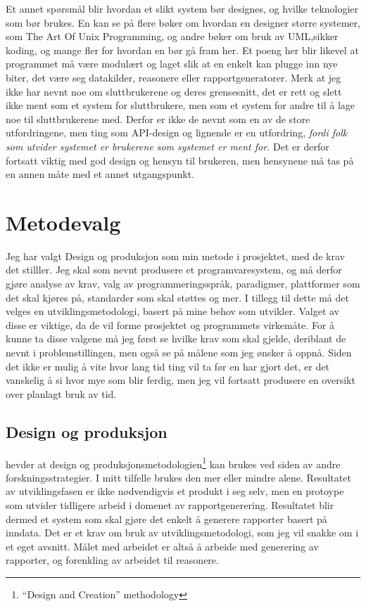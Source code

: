 \documentclass[11pt]{article}
\begin{document}
Et annet spørsmål blir hvordan et slikt system bør designes, og hvilke teknologier som bør brukes. En kan se på flere bøker om hvordan en designer større systemer, som The Art Of Unix Programming\cite{taoup}, og andre bøker om bruk av UML\cite{umlpatterns},sikker koding\cite{certguide}, og mange fler for hvordan en bør gå fram her. Et poeng her blir likevel at programmet må være modulært og laget slik at en enkelt kan plugge inn nye biter, det være seg datakilder, reasonere eller rapportgeneratorer. Merk at jeg ikke har nevnt noe om sluttbrukerene og deres grensesnitt, det er rett og slett ikke ment som et system for sluttbrukere, men som et system for andre til å lage noe til sluttbrukerene med. Derfor er ikke de nevnt som en av de store utfordringene, men ting som API-design og lignende er en utfordring, \emph{fordi folk som utvider systemet er brukerene som systemet er ment for.} Det er derfor fortsatt viktig med god design og hensyn til brukeren, men hensynene må tas på en annen måte med et annet utgangspunkt.

\section{Metodevalg}
Jeg har valgt Design og produksjon som min metode i prosjektet, med de krav det stilller.
Jeg skal som nevnt produsere et programvaresystem, og må derfor gjøre analyse av krav, valg av programmeringsspråk, paradigmer, plattformer som det skal kjøres på, standarder som skal støttes og mer.
I tillegg til dette må det velges en utviklingsmetodologi, basert på mine behov som utvikler. Valget av disse er viktige, da de vil forme prosjektet og programmets virkemåte. For å kunne ta disse valgene må jeg først se hvilke krav som skal gjelde, deriblant de nevnt i problemstillingen, men også se på målene som jeg ønsker å oppnå.
Siden det ikke er mulig å vite hvor lang tid ting vil ta før en har gjort det, er det vanskelig å si hvor mye som blir ferdig, men jeg vil fortsatt produsere en oversikt over planlagt bruk av tid.


\subsection{Design og produksjon}
\cite[p.111]{Oates2006} hevder at design og produksjonsmetodologien\footnote{``Design and Creation'' methodology} kan brukes ved siden av andre forskningsstrategier. I mitt tilfelle brukes den mer eller mindre alene.
Resultatet av utviklingsfasen er ikke nødvendigvis et produkt i seg selv, men en protoype som utvider tidligere arbeid i domenet av rapportgenerering. Resultatet blir dermed et system som skal gjøre det enkelt å generere rapporter basert på inndata.
Det er et krav om bruk av utviklingsmetodologi, som jeg vil snakke om i et eget avsnitt. Målet med arbeidet er altså å arbeide med generering av rapporter, og forenkling av arbeidet til reasonere.
\end{document}

